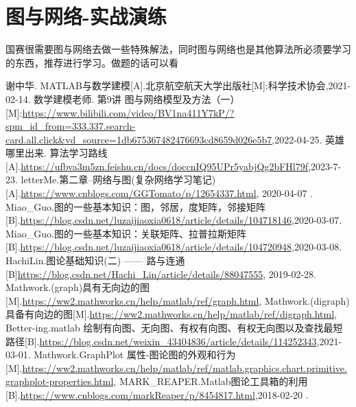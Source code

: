 \documentclass[a4paper,20pt]{article}
\begin{document}
\section{图与网络-实战演练}
\par 国赛很需要图与网络去做一些特殊解法，同时图与网络也是其他算法所必须要学习的东西，推荐进行学习。做题的话可以看
\newpage
\begin{thebibliography}{99}
    谢中华. MATLAB与数学建模[A].北京航空航天大学出版社[M]:科学技术协会,2021-02-14.
    数学建模老师. 第9讲 图与网络模型及方法（一）[M]:\url{https://www.bilibili.com/video/BV1na411Y7kP/?spm_id_from=333.337.search-card.all.click&vd_source=1db675367482476693cd8659d026e5b7},2022-04-25.
    英雄哪里出来. 算法学习路线[A].\url{https://ufbva3m5zn.feishu.cn/docs/doccnIQ95UPr5yabjQg2bFHl79f},2023-7-23.
    letterMe.第二章--网络与图(复杂网络学习笔记)[A].\url{https://www.cnblogs.com/GGTomato/p/12654337.html}, 2020-04-07 .
    Miao\_Guo.图的一些基本知识：图，邻居，度矩阵，邻接矩阵[B].\url{https://blog.csdn.net/luzaijiaoxia0618/article/details/104718146},2020-03-07.
    Miao\_Guo.图的一些基本知识：关联矩阵、拉普拉斯矩阵[B].\url{https://blog.csdn.net/luzaijiaoxia0618/article/details/104720948},2020-03-08.
    HachiLin.图论基础知识(二) —— 路与连通[B]\url{https://blog.csdn.net/Hachi_Lin/article/details/88047555}, 2019-02-28.
    Mathwork.(graph)具有无向边的图[M].\url{https://ww2.mathworks.cn/help/matlab/ref/graph.html},
    Mathwork.(digraph)具备有向边的图[M].\url{https://ww2.mathworks.cn/help/matlab/ref/digraph.html},
    Better-ing.matlab 绘制有向图、无向图、有权有向图、有权无向图以及查找最短路径[B].\url{https://blog.csdn.net/weixin_43404836/article/details/114252343},2021-03-01.
    Mathwork.GraphPlot 属性-图论图的外观和行为[M].\url{https://ww2.mathworks.cn/help/matlab/ref/matlab.graphics.chart.primitive.graphplot-properties.html},
     MARK\_REAPER.Matlab图论工具箱的利用[B].\url{https://www.cnblogs.com/markReaper/p/8454817.html},2018-02-20 .
\end{thebibliography}
\newpage
\end{document}
